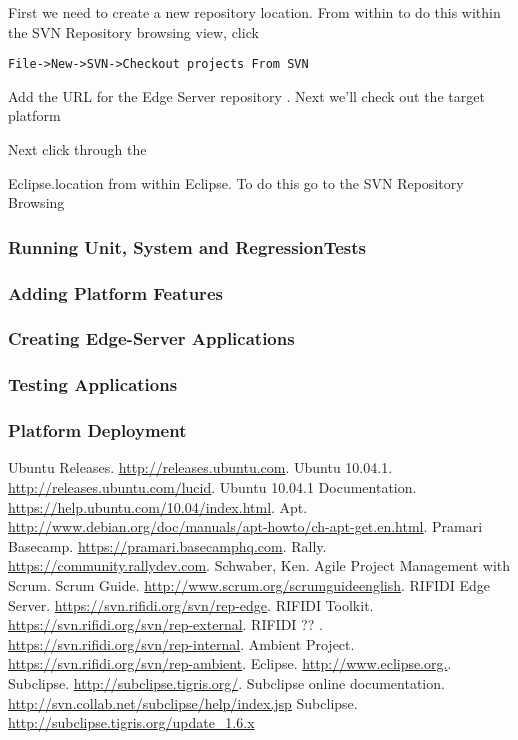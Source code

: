 \documentclass[11pt]{article}
\begin{document}
First we need to create a new repository location.  From within to do this within the SVN Repository browsing view, click 
\begin{verbatim}  
File->New->SVN->Checkout projects From SVN
\end{verbatim}

Add the URL for the Edge Server repository \cite{rep-edge}.  Next we'll check out the target platform

Next click through the 


Eclipse.location from within Eclipse.  To do this go to the SVN Repository Browsing

\subsubsection{Running Unit, System and RegressionTests}
\subsubsection{Adding Platform Features}
\subsubsection{Creating Edge-Server Applications}
\subsubsection{Testing Applications}
\subsubsection{Platform Deployment}

\begin{thebibliography}{99}
 Ubuntu Releases.  \url{http://releases.ubuntu.com}.
 Ubuntu 10.04.1.  \url{http://releases.ubuntu.com/lucid}.
 Ubuntu 10.04.1 Documentation. \url{https://help.ubuntu.com/10.04/index.html}.
 Apt.  \url{http://www.debian.org/doc/manuals/apt-howto/ch-apt-get.en.html}.
 Pramari Basecamp.  \url{https://pramari.basecamphq.com}.
  Rally.  \url{https://community.rallydev.com}.
  Schwaber, Ken. Agile Project Management with Scrum.
 Scrum Guide.  \url{http://www.scrum.org/scrumguideenglish}. 
 RIFIDI Edge Server. \url{https://svn.rifidi.org/svn/rep-edge}.
 RIFIDI Toolkit. \url{https://svn.rifidi.org/svn/rep-external}.
 RIFIDI ?? . \url{https://svn.rifidi.org/svn/rep-internal}.
 Ambient Project. \url{https://svn.rifidi.org/svn/rep-ambient}.
 Eclipse.  \url{http://www.eclipse.org.}.
 Subclipse.  \url{http://subclipse.tigris.org/}.
 Subclipse online documentation.  \url{http://svn.collab.net/subclipse/help/index.jsp}
 Subclipse.  \url{http://subclipse.tigris.org/update_1.6.x}
\end{thebibliography}
\end{document}
